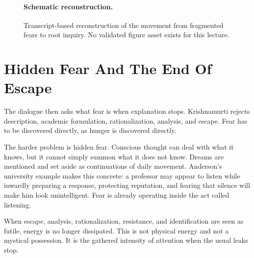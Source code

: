 \documentclass[11pt,oneside]{book}
\begin{document}
\begin{figure}
\centering
{}

\paragraph{Schematic reconstruction.}
Transcript-based reconstruction of the movement from fragmented fears to root inquiry. No validated figure asset exists for this lecture.
\end{figure}

\section{Hidden Fear And The End Of Escape}

The dialogue then asks what fear is when explanation stops. Krishnamurti rejects description, academic formulation, rationalization, analysis, and escape. Fear has to be discovered directly, as hunger is discovered directly.

The harder problem is hidden fear. Conscious thought can deal with what it knows, but it cannot simply summon what it does not know. Dreams are mentioned and set aside as continuations of daily movement. Anderson's university example makes this concrete: a professor may appear to listen while inwardly preparing a response, protecting reputation, and fearing that silence will make him look unintelligent. Fear is already operating inside the act called listening.

When escape, analysis, rationalization, resistance, and identification are seen as futile, energy is no longer dissipated. This is not physical energy and not a mystical possession. It is the gathered intensity of attention when the usual leaks stop.
\end{document}
